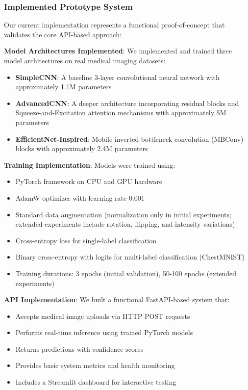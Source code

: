 \documentclass[12pt,a4paper]{article}
\begin{document}
\subsubsection{Implemented Prototype System}

Our current implementation represents a functional proof-of-concept that validates the core API-based approach:

\textbf{Model Architectures Implemented}: We implemented and trained three model architectures on real medical imaging datasets:
\begin{itemize}
    \item \textbf{SimpleCNN}: A baseline 3-layer convolutional neural network with approximately 1.1M parameters
    \item \textbf{AdvancedCNN}: A deeper architecture incorporating residual blocks and Squeeze-and-Excitation attention mechanisms with approximately 5M parameters
    \item \textbf{EfficientNet-Inspired}: Mobile inverted bottleneck convolution (MBConv) blocks with approximately 2.4M parameters
\end{itemize}

\textbf{Training Implementation}: Models were trained using:
\begin{itemize}
    \item PyTorch framework on CPU and GPU hardware
    \item AdamW optimizer with learning rate 0.001
    \item Standard data augmentation (normalization only in initial experiments; extended experiments include rotation, flipping, and intensity variations)
    \item Cross-entropy loss for single-label classification
    \item Binary cross-entropy with logits for multi-label classification (ChestMNIST)
    \item Training durations: 3 epochs (initial validation), 50-100 epochs (extended experiments)
\end{itemize}

\textbf{API Implementation}: We built a functional FastAPI-based system that:
\begin{itemize}
    \item Accepts medical image uploads via HTTP POST requests
    \item Performs real-time inference using trained PyTorch models
    \item Returns predictions with confidence scores
    \item Provides basic system metrics and health monitoring
    \item Includes a Streamlit dashboard for interactive testing
\end{itemize}
\end{document}
